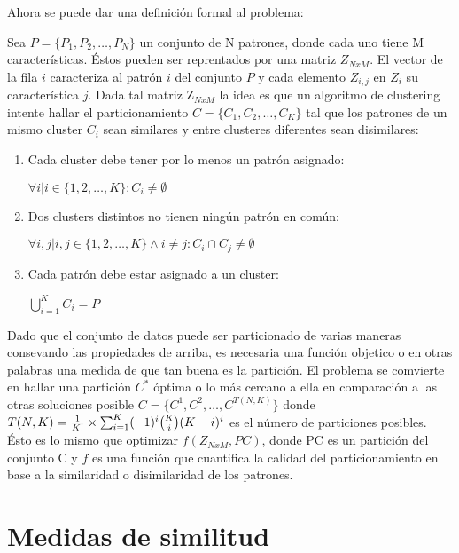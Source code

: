 Ahora se puede dar una definici\'on formal al problema:

Sea $P = \{ P_1, P_2, \dots , P_N\}$ un conjunto de N patrones, 
donde cada uno tiene M caracter\'isticas. Éstos pueden
ser reprentados por una matriz $Z_{NxM}$. El vector de la fila $i$ caracteriza al 
patr\'on $i$ del conjunto $P$ y cada elemento $Z_{i,j}$ en $Z_i$ su caracter\'istica $j$.
Dada tal matriz Z$_{NxM}$ la idea es que un algoritmo de clustering intente hallar
el particionamiento $C = \{ C_1, C_2, \dots , C_K \}$ tal que los patrones
de un mismo cluster $C_i$ sean similares y entre clusteres diferentes
sean disimilares:

\begin{enumerate} \label{en:properties}

\item Cada cluster debe tener por lo menos un patr\'on asignado:

$\forall i | i \in \{1, 2, \dots, K\} : C_i \neq \emptyset$

\item Dos clusters distintos no tienen ning\'un patr\'on en com\'un:

$\forall i,j | i,j\in \{1, 2, \dots, K\} \land i \neq j:  C_i \cap C_j \neq \emptyset$

\item Cada patr\'on debe estar asignado a un cluster:

$\bigcup_{i=1}^{K} C_i = P$

\end{enumerate}

Dado que el conjunto de datos puede ser particionado de varias maneras
consevando las propiedades de arriba, es necesaria una función objetico o en otras palabras
una medida de que tan buena es la partici\'on. El problema se comvierte en hallar
una partici\'on $C^*$  \'optima o lo m\'as cercano a ella en comparaci\'on a 
las otras soluciones posible $C = \{ C^1, C^2, \dots, C^{T(N,K)} \}$ donde 
$T(N,K) = { {1 \over K!} \times {\sum_{i=1}^{K} (-1)^i  \binom{K}{i} (K-i)^i} }$
es el n\'umero de particiones posibles. \'Esto es lo mismo que optimizar $f(Z_{NxM}, PC)$,
donde PC es un partici\'on del conjunto C y $f$ es una funci\'on que
cuantifica la calidad del particionamiento en base a la similaridad o disimilaridad
de los patrones.

\section{Medidas de similitud} \label{sect:mdist}

